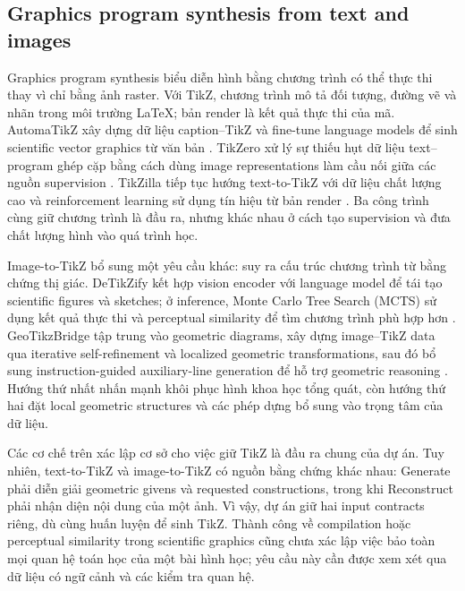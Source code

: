 \documentclass[a4paper,12pt]{article}
\begin{document}
\subsection{Graphics program synthesis from text and images}
Graphics program synthesis biểu diễn hình bằng chương trình có thể thực thi thay vì chỉ bằng ảnh raster. Với TikZ, chương trình mô tả đối tượng, đường vẽ và nhãn trong môi trường \LaTeX; bản render là kết quả thực thi của mã. AutomaTikZ xây dựng dữ liệu caption--TikZ và fine-tune language models để sinh scientific vector graphics từ văn bản \cite{automat}. TikZero xử lý sự thiếu hụt dữ liệu text--program ghép cặp bằng cách dùng image representations làm cầu nối giữa các nguồn supervision \cite{ref1}. TikZilla tiếp tục hướng text-to-TikZ với dữ liệu chất lượng cao và reinforcement learning sử dụng tín hiệu từ bản render \cite{tikzilla}. Ba công trình cùng giữ chương trình là đầu ra, nhưng khác nhau ở cách tạo supervision và đưa chất lượng hình vào quá trình học.

Image-to-TikZ bổ sung một yêu cầu khác: suy ra cấu trúc chương trình từ bằng chứng thị giác. DeTikZify kết hợp vision encoder với language model để tái tạo scientific figures và sketches; ở inference, Monte Carlo Tree Search (MCTS) sử dụng kết quả thực thi và perceptual similarity để tìm chương trình phù hợp hơn \cite{detikzify}. GeoTikzBridge tập trung vào geometric diagrams, xây dựng image--TikZ data qua iterative self-refinement và localized geometric transformations, sau đó bổ sung instruction-guided auxiliary-line generation để hỗ trợ geometric reasoning \cite{geobridge}. Hướng thứ nhất nhấn mạnh khôi phục hình khoa học tổng quát, còn hướng thứ hai đặt local geometric structures và các phép dựng bổ sung vào trọng tâm của dữ liệu.

Các cơ chế trên xác lập cơ sở cho việc giữ TikZ là đầu ra chung của dự án. Tuy nhiên, text-to-TikZ và image-to-TikZ có nguồn bằng chứng khác nhau: Generate phải diễn giải geometric givens và requested constructions, trong khi Reconstruct phải nhận diện nội dung của một ảnh. Vì vậy, dự án giữ hai input contracts riêng, dù cùng huấn luyện để sinh TikZ. Thành công về compilation hoặc perceptual similarity trong scientific graphics cũng chưa xác lập việc bảo toàn mọi quan hệ toán học của một bài hình học; yêu cầu này cần được xem xét qua dữ liệu có ngữ cảnh và các kiểm tra quan hệ.
\end{document}
